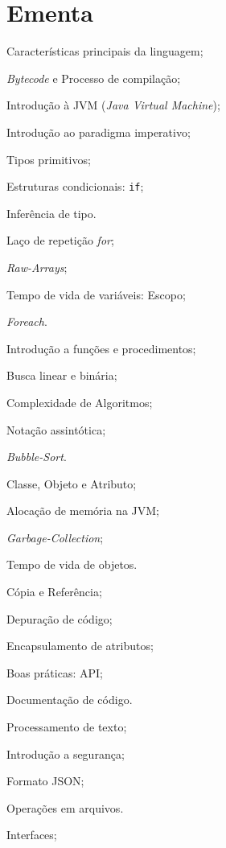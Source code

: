 \documentclass{article}
\begin{document}
\section{Ementa}
\begin{itemize*}[label={}]
    \item[] Características principais da linguagem;
    \item[] \textit{Bytecode} e Processo de compilação;
    \item[] Introdução à JVM (\textit{Java Virtual Machine});
    \item[] Introdução ao paradigma imperativo;
    \item[] Tipos primitivos;
    \item[] Estruturas condicionais: \texttt{if};
    \item[] Inferência de tipo.
    \item[] Laço de repetição \textit{for};
    \item[] \textit{Raw-Arrays};
    \item[] Tempo de vida de variáveis: Escopo;
    \item[] \textit{Foreach}.
    \item[] Introdução a funções e procedimentos;
    \item[] Busca linear e binária;
    \item[] Complexidade de Algoritmos;
    \item[] Notação assintótica;
    \item[] \textit{Bubble-Sort}.
    \item[] Classe, Objeto e Atributo;
    \item[] Alocação de memória na JVM;
    \item[] \textit{Garbage-Collection};
    \item[] Tempo de vida de objetos.
    \item[] Cópia e Referência;
    \item[] Depuração de código;
    \item[] Encapsulamento de atributos;
    \item[] Boas práticas: API\@;
    \item[] Documentação de código.
    \item[] Processamento de texto;
    \item[] Introdução a segurança;
    \item[] Formato JSON;
    \item[] Operações em arquivos.
    \item[] Interfaces;

\end{itemize*}
\end{document}

